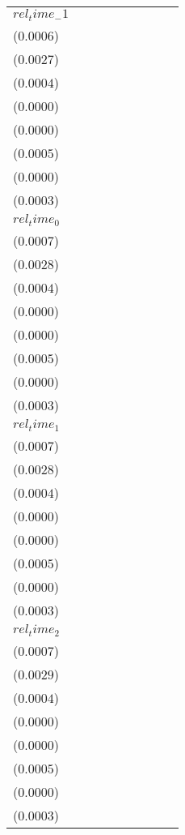 \begin{tabular}{lllllllll}
$rel_time_-1$ & \makecell{$0.0000^{}$ \\ ($0.0006$)} & \makecell{$-0.0001^{}$ \\ ($0.0027$)} & \makecell{$-0.0019^{***}$ \\ ($0.0004$)} & \makecell{$-0.0001^{***}$ \\ ($0.0000$)} & \makecell{$-0.0001^{***}$ \\ ($0.0000$)} & \makecell{$-0.0004^{}$ \\ ($0.0005$)} & \makecell{$0.0000^{}$ \\ ($0.0000$)} & \makecell{$-0.0027^{***}$ \\ ($0.0003$)} \\
$rel_time_0$ & \makecell{$0.0014^{**}$ \\ ($0.0007$)} & \makecell{$0.0060^{**}$ \\ ($0.0028$)} & \makecell{$-0.0010^{**}$ \\ ($0.0004$)} & \makecell{$-0.0001^{***}$ \\ ($0.0000$)} & \makecell{$-0.0000^{***}$ \\ ($0.0000$)} & \makecell{$0.0007^{}$ \\ ($0.0005$)} & \makecell{$0.0000^{}$ \\ ($0.0000$)} & \makecell{$-0.0024^{***}$ \\ ($0.0003$)} \\
$rel_time_1$ & \makecell{$0.0031^{***}$ \\ ($0.0007$)} & \makecell{$0.0131^{***}$ \\ ($0.0028$)} & \makecell{$-0.0020^{***}$ \\ ($0.0004$)} & \makecell{$-0.0001^{***}$ \\ ($0.0000$)} & \makecell{$-0.0001^{***}$ \\ ($0.0000$)} & \makecell{$0.0023^{***}$ \\ ($0.0005$)} & \makecell{$0.0000^{}$ \\ ($0.0000$)} & \makecell{$-0.0020^{***}$ \\ ($0.0003$)} \\
$rel_time_2$ & \makecell{$0.0026^{***}$ \\ ($0.0007$)} & \makecell{$0.0115^{***}$ \\ ($0.0029$)} & \makecell{$-0.0030^{***}$ \\ ($0.0004$)} & \makecell{$-0.0003^{***}$ \\ ($0.0000$)} & \makecell{$-0.0001^{***}$ \\ ($0.0000$)} & \makecell{$0.0017^{***}$ \\ ($0.0005$)} & \makecell{$0.0000^{}$ \\ ($0.0000$)} & \makecell{$-0.0025^{***}$ \\ ($0.0003$)} \\

\end{tabular}
